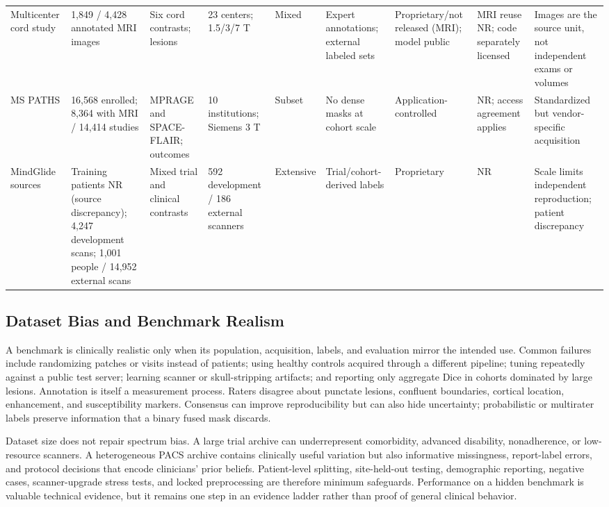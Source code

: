 \documentclass[journal,twoside,web]{ieeecolor}
\begin{document}
\begin{table}[!t]
\begin{tabularx}{\textwidth}{@{}ZZZZZZZZZ@{}}
Multicenter cord study \cite{benveniste} & 1,849 / 4,428 annotated MRI images & Six cord contrasts; lesions & 23 centers; 1.5/3/7 T & Mixed & Expert annotations; external labeled sets & Proprietary/not released (MRI); model public & MRI reuse NR; code separately licensed & Images are the source unit, not independent exams or volumes \\
MS PATHS \cite{mspaths} & 16,568 enrolled; 8,364 with MRI / 14,414 studies & MPRAGE and SPACE-FLAIR; outcomes & 10 institutions; Siemens 3 T & Subset & No dense masks at cohort scale & Application-controlled & NR; access agreement applies & Standardized but vendor-specific acquisition \\
MindGlide sources \cite{mindglide} & Training patients NR (source discrepancy); 4,247 development scans; 1,001 people / 14,952 external scans & Mixed trial and clinical contrasts & 592 development / 186 external scanners & Extensive & Trial/cohort-derived labels & Proprietary & NR & Scale limits independent reproduction; patient discrepancy \\
\bottomrule
\end{tabularx}
\end{table}

\subsection{Dataset Bias and Benchmark Realism}\label{subsec:dataset-bias-and-benchmark-realism}

A benchmark is clinically realistic only when its population, acquisition, labels, and evaluation mirror the intended use. Common failures include randomizing patches or visits instead of patients; using healthy controls acquired through a different pipeline; tuning repeatedly against a public test server; learning scanner or skull-stripping artifacts; and reporting only aggregate Dice in cohorts dominated by large lesions. Annotation is itself a measurement process. Raters disagree about punctate lesions, confluent boundaries, cortical location, enhancement, and susceptibility markers. Consensus can improve reproducibility but can also hide uncertainty; probabilistic or multirater labels preserve information that a binary fused mask discards.


Dataset size does not repair spectrum bias. A large trial archive can underrepresent comorbidity, advanced disability, nonadherence, or low-resource scanners. A heterogeneous PACS archive contains clinically useful variation but also informative missingness, report-label errors, and protocol decisions that encode clinicians' prior beliefs. Patient-level splitting, site-held-out testing, demographic reporting, negative cases, scanner-upgrade stress tests, and locked preprocessing are therefore minimum safeguards. Performance on a hidden benchmark is valuable technical evidence, but it remains one step in an evidence ladder rather than proof of general clinical behavior.
\end{document}
